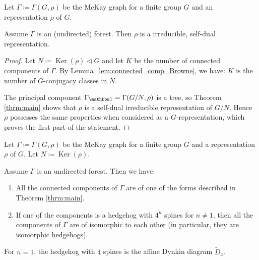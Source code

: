 \documentclass[ALCO]{cedram}
\newcommand{\triv}{{\mathbbm 1}}
\newcommand{\Ker}{\operatorname{Ker}}
\begin{document}
\begin{prop}\label{prop:forest}
 Let $\Gamma \coloneqq  \Gamma(G, \rho)$ be the McKay graph for a finite group $G$ and an representation $\rho$ of $G$. 
 
 Assume $\Gamma$ is an (undirected) forest. Then $\rho$ is a irreducible, self-dual representation.
\end{prop}

\begin{proof}
Let $N {\coloneqq } \Ker(\rho) \vartriangleleft G$ and let $K$ be the number of connected components of $\Gamma$. By Lemma~\ref{lem:connected_comp_Browne}, we have: $K$ is the number of $G$-conjugacy classes in $N$. 

The principal component $\Gamma_{\triv} = \Gamma(G/N, \rho)$ is a tree, so Theorem \ref{thrm:main} shows that $\rho$ is a self-dual irreducible representation of $G/N$. Hence $\rho$ possesses the same properties when considered as a $G$-representation, which proves the first part of the statement. 
\end{proof}

\begin{theorem}\label{thrm:forest}
  Let $\Gamma \coloneqq  \Gamma(G, \rho)$ be the McKay graph for a finite group $G$ and a representation $\rho$ of $G$. Let $N\coloneqq \Ker(\rho)$.
 
 Assume $\Gamma$ is an undirected forest. Then we have:
 \begin{enumerate}
  \item All the connected components of $\Gamma$ are of one of the forms described in Theorem \ref{thrm:main}.
  \item If one of the components is a hedgehog with $4^n$ spines for ${n\neq 1}$, then all the components of $\Gamma$ are of isomorphic to each other ({in particular}, they are isomorphic hedgehogs).

 \end{enumerate}
  

\end{theorem}
\begin{rema}
 For ${n=1}$, the hedgehog with $4$ spines is the  affine Dynkin diagram $\widetilde{D}_4$.
\end{rema}
\end{document}
